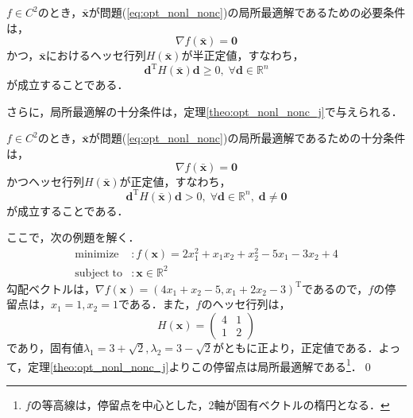 \documentclass{jsreport}
\begin{document}
\begin{theo}\label{theo:opt_nonl_nonc_h_2}
  $f \in C^2$のとき，$\bar{\bm{x}}$が問題(\ref{eq:opt_nonl_nonc})の局所最適解であるための必要条件は，
  \begin{equation}
    \nabla f(\bar{\bm{x}}) = \bm{0} \nonumber
  \end{equation}
  かつ，$\bar{\bm{x}}$におけるヘッセ行列$H(\bar{\bm{x}})$が半正定値，すなわち，
  \begin{equation}
    \bm{d}^{\mathrm{T}} H(\bar{\bm{x}}) \bm{d} \geq 0, \; \forall \bm{d} \in \mathbb{R}^n \nonumber
  \end{equation}
  が成立することである．
\end{theo}

さらに，局所最適解の十分条件は，定理\ref{theo:opt_nonl_nonc_j}で与えられる．
\begin{theo}\label{theo:opt_nonl_nonc_j}
  $f \in C^2$のとき，$\bar{\bm{x}}$が問題(\ref{eq:opt_nonl_nonc})の局所最適解であるための十分条件は，
  \begin{equation}
    \nabla f(\bar{\bm{x}}) = \bm{0} \nonumber
  \end{equation}
  かつヘッセ行列$H(\bar{\bm{x}})$が正定値，すなわち，
  \begin{equation}
    \bm{d}^{\mathrm{T}} H(\bar{\bm{x}}) \bm{d} > 0, \; \forall \bm{d} \in \mathbb{R}^n, \; \bm{d} \neq \bm{0} \nonumber
  \end{equation}
  が成立することである．
\end{theo}

ここで，次の例題を解く．
\begin{align}\label{eq:opt_nonl_nonc}
  \mathrm{minimize} &: f(\bm{x}) = 2x_1^2 + x_1 x_2 + x_2^2 - 5x_1 - 3x_2 + 4 \nonumber\\
  \mathrm{subject \; to} &: \bm{x} \in \mathbb{R}^2 \nonumber
\end{align}
勾配ベクトルは，$\nabla f(\bm{x}) = (4x_1 + x_2 - 5, x_1 + 2x_2 - 3)^{\mathrm{T}}$であるので，$f$の停留点は，$x_1 = 1, x_2 = 1$である．また，$f$のヘッセ行列は，
\begin{equation}
  H(\bm{x}) = \left(
  \begin{array}{cc}
    4 & 1 \\
    1 & 2
  \end{array}
  \right) \nonumber
\end{equation}
であり，固有値$\lambda_1 = 3 + \sqrt{2}, \lambda_2 = 3 - \sqrt{2}$がともに正より，正定値である．よって，定理\ref{theo:opt_nonl_nonc_j}よりこの停留点は局所最適解である\footnote{$f$の等高線は，停留点を中心とした，2軸が固有ベクトルの楕円となる．}．\qed
\end{document}
